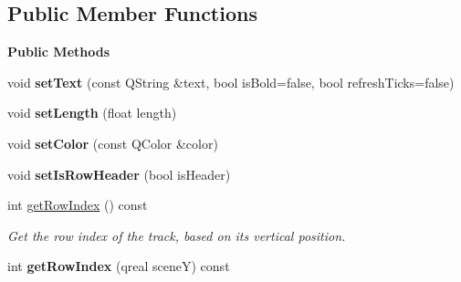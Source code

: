 \subsection*{Public Member Functions}
\begin{Indent}\textbf{ Public Methods}\par
\begin{DoxyCompactItemize}
\item 
\mbox{\label{classrev_1_1_view_1_1_timeline_track_a756d234bad609d975da905102981efb2}} 
void {\bfseries set\+Text} (const Q\+String \&text, bool is\+Bold=false, bool refresh\+Ticks=false)
\item 
\mbox{\label{classrev_1_1_view_1_1_timeline_track_adae81b9452a4edb38af24cf0eba2578f}} 
void {\bfseries set\+Length} (float length)
\item 
\mbox{\label{classrev_1_1_view_1_1_timeline_track_a41817d0f68e78d90c0e1e1766f9e0d04}} 
void {\bfseries set\+Color} (const Q\+Color \&color)
\item 
\mbox{\label{classrev_1_1_view_1_1_timeline_track_a6d80925c946cb5d0b96c0eb81ce8fb2a}} 
void {\bfseries set\+Is\+Row\+Header} (bool is\+Header)
\item 
\mbox{\label{classrev_1_1_view_1_1_timeline_track_ab3152dca358628b6f0608bf6ddd88b97}} 
int \mbox{\hyperlink{classrev_1_1_view_1_1_timeline_track_ab3152dca358628b6f0608bf6ddd88b97}{get\+Row\+Index}} () const
\begin{DoxyCompactList}\small\item\em Get the row index of the track, based on it\textquotesingle{}s vertical position. \end{DoxyCompactList}\item 
\mbox{\label{classrev_1_1_view_1_1_timeline_track_a2fa1c3d2b2d9e14f7ae8af3b3387b7c7}} 
int {\bfseries get\+Row\+Index} (qreal sceneY) const
\end{DoxyCompactItemize}
\end{Indent}
